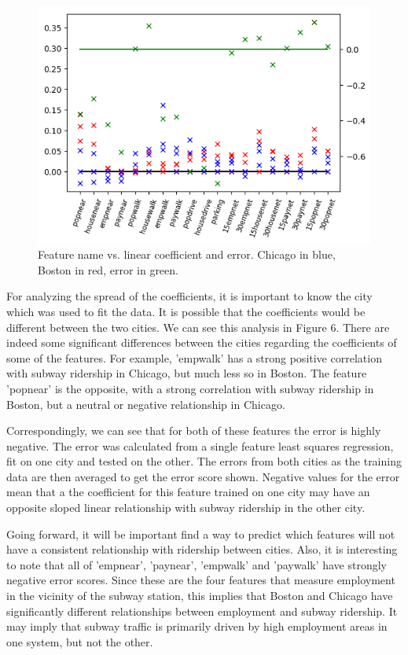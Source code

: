 \documentclass{article}
\begin{document}
\begin{figure}[H]\label{fig:f6}
\begin{center}\includegraphics[scale=1]{coef_by_city}\end{center}
\caption{Feature name vs. linear coefficient and error. Chicago in blue, Boston in red, error in green.}
\end{figure}

For analyzing the spread of the coefficients, it is important to know the city which was used to fit the data. It is possible that the coefficients would be different between the two cities. We can see this analysis in Figure 6. There are indeed some significant differences between the cities regarding the coefficients of some of the features. For example, 'empwalk' has a strong positive correlation with subway ridership in Chicago, but much less so in Boston. The feature 'popnear' is the opposite, with a strong correlation with subway ridership in Boston, but a neutral or negative relationship in Chicago. 

Correspondingly, we can see that for both of these features the error is highly negative. The error was calculated from a single feature least squares regression, fit on one city and tested on the other. The errors from both cities as the training data are then averaged to get the error score shown. Negative values for the error mean that a the coefficient for this feature trained on one city may have an opposite sloped linear relationship with subway ridership in the other city.

Going forward, it will be important find a way to predict which features will not have a consistent relationship with ridership between cities. Also, it is interesting to note that all of 'empnear', 'paynear', 'empwalk' and 'paywalk' have strongly negative error scores. Since these are the four features that measure employment in the vicinity of the subway station, this implies that Boston and Chicago have significantly different relationships between employment and subway ridership. It may imply that subway traffic is primarily driven by high employment areas in one system, but not the other. 
\end{document}

